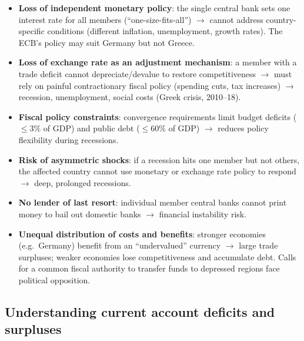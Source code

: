 \documentclass[a4paper,12pt]{article}
\begin{document}
\begin{itemize}
  \item \textbf{Loss of independent monetary policy}: the single central bank sets one interest rate for all members (``one-size-fits-all'') $\to$ cannot address country-specific conditions (different inflation, unemployment, growth rates). The ECB's policy may suit Germany but not Greece.
  \item \textbf{Loss of exchange rate as an adjustment mechanism}: a member with a trade deficit cannot depreciate/devalue to restore competitiveness $\to$ must rely on painful contractionary fiscal policy (spending cuts, tax increases) $\to$ recession, unemployment, social costs (Greek crisis, 2010--18).
  \item \textbf{Fiscal policy constraints}: convergence requirements limit budget deficits ($\leq 3\%$ of GDP) and public debt ($\leq 60\%$ of GDP) $\to$ reduces policy flexibility during recessions.
  \item \textbf{Risk of asymmetric shocks}: if a recession hits one member but not others, the affected country cannot use monetary or exchange rate policy to respond $\to$ deep, prolonged recessions.
  \item \textbf{No lender of last resort}: individual member central banks cannot print money to bail out domestic banks $\to$ financial instability risk.
  \item \textbf{Unequal distribution of costs and benefits}: stronger economies (e.g.\ Germany) benefit from an ``undervalued'' currency $\to$ large trade surpluses; weaker economies lose competitiveness and accumulate debt. Calls for a common fiscal authority to transfer funds to depressed regions face political opposition.
\end{itemize}
\subsection{Understanding current account deficits and surpluses}
\end{document}
